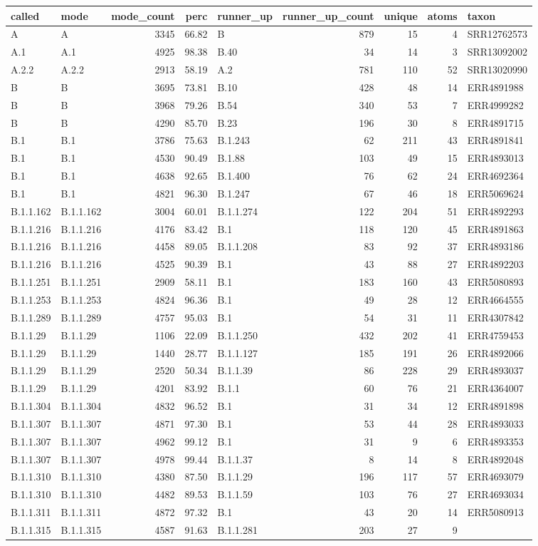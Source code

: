 \documentclass[
]{article}
\begin{document}
\begin{longtable}[]{@{}llrrlrrrl@{}}
\toprule
called & mode & mode\_count & perc & runner\_up & runner\_up\_count &
unique & atoms & taxon\tabularnewline
\midrule
\endhead
A & A & 3345 & 66.82 & B & 879 & 15 & 4 & SRR12762573\tabularnewline
A.1 & A.1 & 4925 & 98.38 & B.40 & 34 & 14 & 3 &
SRR13092002\tabularnewline
A.2.2 & A.2.2 & 2913 & 58.19 & A.2 & 781 & 110 & 52 &
SRR13020990\tabularnewline
B & B & 3695 & 73.81 & B.10 & 428 & 48 & 14 & ERR4891988\tabularnewline
B & B & 3968 & 79.26 & B.54 & 340 & 53 & 7 & ERR4999282\tabularnewline
B & B & 4290 & 85.70 & B.23 & 196 & 30 & 8 & ERR4891715\tabularnewline
B.1 & B.1 & 3786 & 75.63 & B.1.243 & 62 & 211 & 43 &
ERR4891841\tabularnewline
B.1 & B.1 & 4530 & 90.49 & B.1.88 & 103 & 49 & 15 &
ERR4893013\tabularnewline
B.1 & B.1 & 4638 & 92.65 & B.1.400 & 76 & 62 & 24 &
ERR4692364\tabularnewline
B.1 & B.1 & 4821 & 96.30 & B.1.247 & 67 & 46 & 18 &
ERR5069624\tabularnewline
B.1.1.162 & B.1.1.162 & 3004 & 60.01 & B.1.1.274 & 122 & 204 & 51 &
ERR4892293\tabularnewline
B.1.1.216 & B.1.1.216 & 4176 & 83.42 & B.1 & 118 & 120 & 45 &
ERR4891863\tabularnewline
B.1.1.216 & B.1.1.216 & 4458 & 89.05 & B.1.1.208 & 83 & 92 & 37 &
ERR4893186\tabularnewline
B.1.1.216 & B.1.1.216 & 4525 & 90.39 & B.1 & 43 & 88 & 27 &
ERR4892203\tabularnewline
B.1.1.251 & B.1.1.251 & 2909 & 58.11 & B.1 & 183 & 160 & 43 &
ERR5080893\tabularnewline
B.1.1.253 & B.1.1.253 & 4824 & 96.36 & B.1 & 49 & 28 & 12 &
ERR4664555\tabularnewline
B.1.1.289 & B.1.1.289 & 4757 & 95.03 & B.1 & 54 & 31 & 11 &
ERR4307842\tabularnewline
B.1.1.29 & B.1.1.29 & 1106 & 22.09 & B.1.1.250 & 432 & 202 & 41 &
ERR4759453\tabularnewline
B.1.1.29 & B.1.1.29 & 1440 & 28.77 & B.1.1.127 & 185 & 191 & 26 &
ERR4892066\tabularnewline
B.1.1.29 & B.1.1.29 & 2520 & 50.34 & B.1.1.39 & 86 & 228 & 29 &
ERR4893037\tabularnewline
B.1.1.29 & B.1.1.29 & 4201 & 83.92 & B.1.1 & 60 & 76 & 21 &
ERR4364007\tabularnewline
B.1.1.304 & B.1.1.304 & 4832 & 96.52 & B.1 & 31 & 34 & 12 &
ERR4891898\tabularnewline
B.1.1.307 & B.1.1.307 & 4871 & 97.30 & B.1 & 53 & 44 & 28 &
ERR4893033\tabularnewline
B.1.1.307 & B.1.1.307 & 4962 & 99.12 & B.1 & 31 & 9 & 6 &
ERR4893353\tabularnewline
B.1.1.307 & B.1.1.307 & 4978 & 99.44 & B.1.1.37 & 8 & 14 & 8 &
ERR4892048\tabularnewline
B.1.1.310 & B.1.1.310 & 4380 & 87.50 & B.1.1.29 & 196 & 117 & 57 &
ERR4693079\tabularnewline
B.1.1.310 & B.1.1.310 & 4482 & 89.53 & B.1.1.59 & 103 & 76 & 27 &
ERR4693034\tabularnewline
B.1.1.311 & B.1.1.311 & 4872 & 97.32 & B.1 & 43 & 20 & 14 &
ERR5080913\tabularnewline
B.1.1.315 & B.1.1.315 & 4587 & 91.63 & B.1.1.281 & 203 & 27 & 9 &

\end{longtable}
\end{document}
